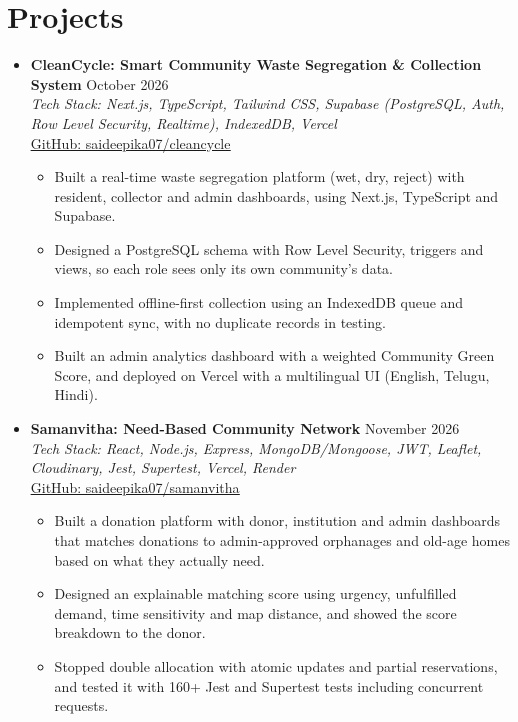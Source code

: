 \documentclass[letterpaper,11pt]{article}
\begin{document}
\section{Projects}
  \begin{itemize}[leftmargin=0.15in, label={}]
    \item
      \textbf{CleanCycle: Smart Community Waste Segregation \& Collection System} \hfill October 2026 \\
      \textit{Tech Stack: Next.js, TypeScript, Tailwind CSS, Supabase (PostgreSQL, Auth, Row Level Security, Realtime), IndexedDB, Vercel} \\
      \href{https://github.com/saideepika07/cleancycle}{\underline{GitHub: saideepika07/cleancycle}}
      \begin{itemize}
        \item Built a real-time waste segregation platform (wet, dry, reject) with resident, collector and admin dashboards, using Next.js, TypeScript and Supabase.
        \item Designed a PostgreSQL schema with Row Level Security, triggers and views, so each role sees only its own community's data.
        \item Implemented offline-first collection using an IndexedDB queue and idempotent sync, with no duplicate records in testing.
        \item Built an admin analytics dashboard with a weighted Community Green Score, and deployed on Vercel with a multilingual UI (English, Telugu, Hindi).
      \end{itemize}
    \item
      \textbf{Samanvitha: Need-Based Community Network} \hfill November 2026 \\
      \textit{Tech Stack: React, Node.js, Express, MongoDB/Mongoose, JWT, Leaflet, Cloudinary, Jest, Supertest, Vercel, Render} \\
      \href{https://github.com/saideepika07/samanvitha}{\underline{GitHub: saideepika07/samanvitha}}
      \begin{itemize}
        \item Built a donation platform with donor, institution and admin dashboards that matches donations to admin-approved orphanages and old-age homes based on what they actually need.
        \item Designed an explainable matching score using urgency, unfulfilled demand, time sensitivity and map distance, and showed the score breakdown to the donor.
        \item Stopped double allocation with atomic updates and partial reservations, and tested it with 160+ Jest and Supertest tests including concurrent requests.

\end{itemize}
\end{itemize}
\end{document}
